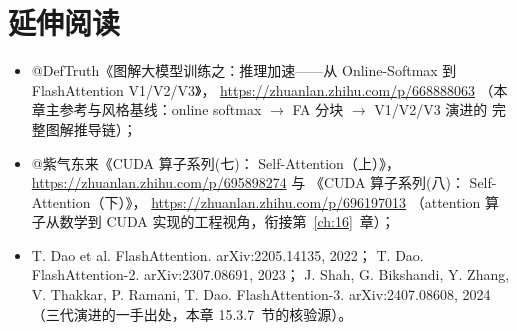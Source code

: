 \section*{延伸阅读}

\begin{itemize}
  \item @DefTruth《图解大模型训练之：推理加速——从 Online-Softmax 到
        FlashAttention V1/V2/V3》，
        \url{https://zhuanlan.zhihu.com/p/668888063}
        （本章主参考与风格基线：online softmax $\to$ FA 分块 $\to$ V1/V2/V3 演进的
        完整图解推导链）；
  \item @紫气东来《CUDA 算子系列(七)： Self-Attention（上）》，
        \url{https://zhuanlan.zhihu.com/p/695898274} 与
        《CUDA 算子系列(八)： Self-Attention（下）》，
        \url{https://zhuanlan.zhihu.com/p/696197013}
        （attention 算子从数学到 CUDA 实现的工程视角，衔接第~\ref{ch:16}~章）；
  \item T. Dao et al. FlashAttention. arXiv:2205.14135, 2022；
        T. Dao. FlashAttention-2. arXiv:2307.08691, 2023；
        J. Shah, G. Bikshandi, Y. Zhang, V. Thakkar, P. Ramani, T. Dao.
        FlashAttention-3. arXiv:2407.08608, 2024
        （三代演进的一手出处，本章 15.3.7~节的核验源）。
\end{itemize}
